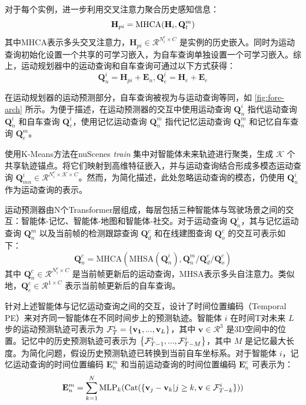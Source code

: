 对于每个实例，进一步利用交叉注意力聚合历史感知信息：
\begin{equation}
{{\mathbf{H}}_{pi}} = {\rm{MHCA}}({{\mathbf{H}}_i},{\mathbf{Q}}_t^m)
\end{equation}
其中MHCA表示多头交叉注意力\cite{vaswani2017attention}，$\textbf{H}_{pi}\in\mathcal{R}^{N^c_i \times C}$ 是实例的历史嵌入。同时为运动查询初始化设置一个共享的可学习嵌入，为自车查询单独设置一个可学习嵌入。综上，运动规划器中的运动查询和自车查询可通过以下方式获得：
\begin{equation}
{\mathbf{Q}}_n^i = {{\mathbf{H}}_{pi}} + {{\mathbf{E}}_n},{\mathbf{Q}}_e^i = {{\mathbf{H}}_e} + {{\mathbf{E}}_e}
\end{equation}

在运动规划器的运动预测部分，自车查询被视为与运动查询等同，如 \cref{fig:fore-arch} 所示。为便于描述，在运动预测器的交互中使用运动查询 $\mathbf{Q}_n^i$ 指代运动查询 $\mathbf{Q}_n^i$ 和自车查询 $\mathbf{Q}_e^i$，使用记忆运动查询 $\mathbf{Q}_n^m$ 指代记忆运动查询 $\mathbf{Q}_n^m$ 和记忆自车查询 $\mathbf{Q}_e^m$。

使用K-Means方法在nuScenes \textit{train} 集中对智能体未来轨迹进行聚类，生成 $\mathcal{K}$ 个共享轨迹锚点。将它们映射到高维特征嵌入，并与运动查询结合形成多模态运动查询 $\mathbf{Q}_{mn}^i \in \mathcal{R}^{N^c_i\times \mathcal{K} \times C}$。然而，为简化描述，此处忽略运动查询的模态，仍使用 $\mathbf{Q}_{n}^i$ 作为运动查询的表示。

运动预测器由N个Transformer层组成，每层包括三种智能体与驾驶场景之间的交互：智能体-记忆、智能体-地图和智能体-社交。对于运动查询 $\mathbf{Q}_{n}^i$，其与记忆运动查询 $\mathbf{Q}_{n}^m$ 以及当前帧的检测跟踪查询 $\mathbf{Q}_{d}^c$ 和在线建图查询 $\mathbf{Q}_{o}^c$ 的交互可表示如下：
\begin{equation}
\mathbf{Q}_{n}^c = \text{MHCA}(\text{MHSA}(\mathbf{Q}_{n}^i),\mathbf{Q}_{n}^m / \mathbf{Q}_{d}^c/ \mathbf{Q}_{o}^c)
\end{equation}
其中 $\mathbf{Q}_{n}^c \in \mathcal{R}^{N^c_i \times C}$ 是当前帧更新后的运动查询，MHSA表示多头自注意力\cite{vaswani2017attention}。类似地，$\mathbf{Q}_{e}^c \in \mathcal{R}^{1 \times C}$ 表示当前帧更新后的自车查询。

针对上述智能体与记忆运动查询之间的交互，设计了时间位置编码（Temporal PE）来对齐同一智能体在不同时间步上的预测轨迹。智能体 $i$ 在时间T对未来 $L$ 步的运动预测轨迹可表示为 ${\cal F}_T^i = \{ {{\mathbf{v}}_{\mathbf{1}}},...,{{\mathbf{v}}_L}\}$，其中 $\mathbf{v}\in \mathcal{R}^3$ 是3D空间中的位置。记忆中的历史预测轨迹可表示为 $\left\{ {{\cal F}_{T - 1}^i,...,{\cal F}_{T - M}^i} \right\}$，其中 $M$ 是记忆最大长度。为简化问题，假设历史预测轨迹已转换到当前自车坐标系。对于智能体 $i$，记忆运动查询的时间位置编码 $\mathbf{E}_{n}^m$ 和当前运动查询的时间位置编码 $\mathbf{E}_{n}^c$ 可表示为：
\begin{equation}
\mathbf{E}_{n}^m = \sum\limits_{k = 1}^N {{\rm{ML}}{{\rm{P}}_k}({\rm{Cat}}(\{ {{\mathbf{v}}_j} - {{\mathbf{v}}_k}|j \ge k,{\mathbf{v}} \in {\cal F}_{T - k}^i\} ))}
\label{eq:ts_align_pe_memory}
\end{equation}

